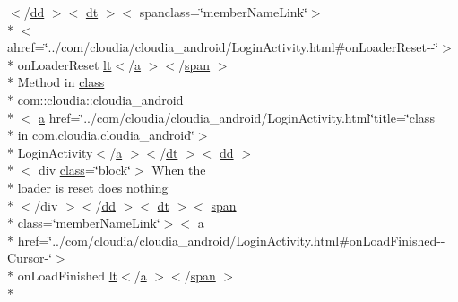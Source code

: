 \begin{DoxyCompactItemize}
\item 
$<$/\hyperlink{stylesheet_8css_a47f4718a86835a7771ec592ece845221}{dd} $>$$<$ \hyperlink{stylesheet_8css_a107565fb4039d33b041380d6e0ea1d80}{dt} $>$$<$ spanclass=\char`\"{}member\-Name\-Link\char`\"{}$>$\\*
$<$ ahref=\char`\"{}../com/cloudia/cloudia\-\_\-android/Login\-Activity.\-html\#on\-Loader\-Reset-\/-\/\char`\"{}$>$\\*
 on\-Loader\-Reset \hyperlink{overview-tree_8html_aac3322e12d911341c3d470b46b2d80f4}{lt}$<$/\hyperlink{style_8css_a5e8981582017bb8b84c21f148345d1f7}{a} $>$$<$/\hyperlink{stylesheet_8css_a8343996ebcf16220b04e54659aac31cc}{span} $>$\\*
 Method in \hyperlink{_tools_8html_acf06f836132665ba8114f5a414c2403f}{class} \\*
com\-::cloudia\-::cloudia\-\_\-android\\*
$<$ \hyperlink{style_8css_a5e8981582017bb8b84c21f148345d1f7}{a} href=\char`\"{}../com/cloudia/cloudia\-\_\-android/Login\-Activity.\-html\char`\"{}title=\char`\"{}class \\*
in com.\-cloudia.\-cloudia\-\_\-android\char`\"{}$>$\\*
 Login\-Activity$<$/\hyperlink{style_8css_a5e8981582017bb8b84c21f148345d1f7}{a} $>$$<$/\hyperlink{stylesheet_8css_a107565fb4039d33b041380d6e0ea1d80}{dt} $>$$<$ \hyperlink{stylesheet_8css_a47f4718a86835a7771ec592ece845221}{dd} $>$\\*
$<$ div \hyperlink{_tools_8html_acf06f836132665ba8114f5a414c2403f}{class}=\char`\"{}block\char`\"{}$>$ When the \\*
loader is \hyperlink{_login_activity_8html_abd713df3bde238b4087ddfd70693359a}{reset} does nothing\\*
$<$/div $>$$<$/\hyperlink{stylesheet_8css_a47f4718a86835a7771ec592ece845221}{dd} $>$$<$ \hyperlink{stylesheet_8css_a107565fb4039d33b041380d6e0ea1d80}{dt} $>$$<$ \hyperlink{stylesheet_8css_a8343996ebcf16220b04e54659aac31cc}{span} \\*
\hyperlink{_tools_8html_acf06f836132665ba8114f5a414c2403f}{class}=\char`\"{}member\-Name\-Link\char`\"{}$>$$<$ a \\*
href=\char`\"{}../com/cloudia/cloudia\-\_\-android/Login\-Activity.\-html\#on\-Load\-Finished-\/-\/Cursor-\/\char`\"{}$>$\\*
 on\-Load\-Finished \hyperlink{overview-tree_8html_aac3322e12d911341c3d470b46b2d80f4}{lt}$<$/\hyperlink{style_8css_a5e8981582017bb8b84c21f148345d1f7}{a} $>$$<$/\hyperlink{stylesheet_8css_a8343996ebcf16220b04e54659aac31cc}{span} $>$\\*

\end{DoxyCompactItemize}
